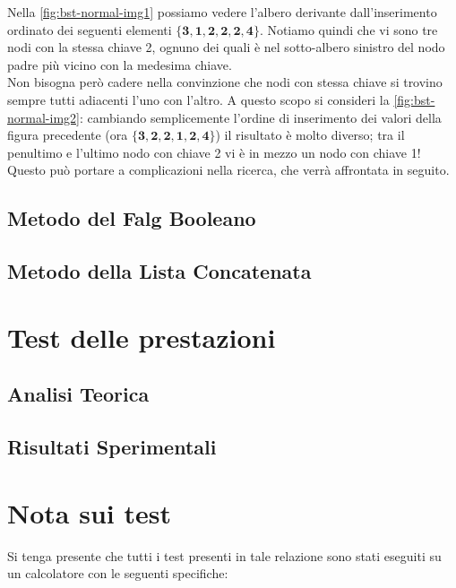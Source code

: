 \documentclass{article}
\begin{document}
Nella \cref{fig:bst-normal-img1} possiamo vedere l'albero derivante dall'inserimento ordinato dei seguenti elementi \(\mathbf{\{3, 1, 2, 2, 2, 4\}}\). Notiamo quindi che vi sono tre nodi con la stessa chiave 2, ognuno dei quali è nel sotto-albero sinistro del nodo padre più vicino con la medesima chiave.
\\
Non bisogna però cadere nella convinzione che nodi con stessa chiave si trovino sempre tutti adiacenti l'uno con l'altro.
A questo scopo si consideri la \cref{fig:bst-normal-img2}:  cambiando semplicemente l'ordine di inserimento dei valori della figura precedente (ora \(\mathbf{\{3, 2, 2, 1, 2, 4\}}\)) il risultato è molto diverso; tra il penultimo e l'ultimo nodo con chiave 2 vi è in mezzo un nodo con chiave 1!
Questo può portare a complicazioni nella ricerca, che verrà affrontata in seguito. 






\subsection{Metodo del Falg Booleano}
\label{subsec:fag-implementation}






\subsection{Metodo della Lista Concatenata}
\label{subsec:list-implementation}




\section{Test delle prestazioni}
\subsection{Analisi Teorica}
\subsection{Risultati Sperimentali}
\newpage

\section*{Nota sui test}

Si tenga presente che tutti i test presenti in tale relazione sono stati eseguiti su un calcolatore con le seguenti specifiche:
\end{document}
